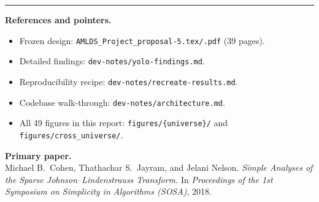 \documentclass[11pt]{article}
\begin{document}
\bigskip
\hrule
\bigskip

\textbf{References and pointers.}
\begin{itemize}
    \item Frozen design: \texttt{AMLDS\_Project\_proposal-5.tex/.pdf} (39 pages).
    \item Detailed findings: \texttt{dev-notes/yolo-findings.md}.
    \item Reproducibility recipe: \texttt{dev-notes/recreate-results.md}.
    \item Codebase walk-through: \texttt{dev-notes/architecture.md}.
    \item All 49 figures in this report: \texttt{figures/\{universe\}/} and \texttt{figures/cross\_universe/}.
\end{itemize}

\textbf{Primary paper.}\\
Michael B.~Cohen, Thathachar S.~Jayram, and Jelani Nelson. \emph{Simple Analyses of the Sparse Johnson--Lindenstrauss Transform.} In \emph{Proceedings of the 1st Symposium on Simplicity in Algorithms (SOSA)}, 2018.
\end{document}
